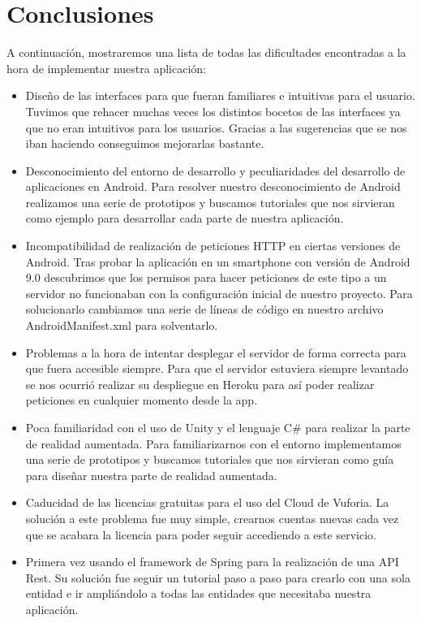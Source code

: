 \section{Conclusiones}
\label{makereference4.8}
A continuación, mostraremos una lista de todas las dificultades encontradas a la hora de implementar nuestra aplicación:
\begin{itemize}
    \item Diseño de las interfaces para que fueran familiares e intuitivas para el usuario. Tuvimos que rehacer muchas veces los distintos bocetos de las interfaces ya que no eran intuitivos para los usuarios. Gracias a las sugerencias que se nos iban haciendo conseguimos mejorarlas bastante.
    \item Desconocimiento del entorno de desarrollo y peculiaridades del desarrollo de aplicaciones en Android. Para resolver nuestro desconocimiento de Android realizamos una serie de prototipos y buscamos tutoriales que nos sirvieran como ejemplo para desarrollar cada parte de nuestra aplicación.
    \item Incompatibilidad de realización de peticiones HTTP en ciertas versiones de Android. Tras probar la aplicación en un smartphone con versión de Android 9.0 descubrimos que los permisos para hacer peticiones de este tipo a un servidor no funcionaban con la configuración inicial de nuestro proyecto. Para solucionarlo cambiamos una serie de líneas de código en nuestro archivo AndroidManifest.xml para solventarlo.
    \item Problemas a la hora de intentar desplegar el servidor de forma correcta para que fuera accesible siempre. Para que el servidor estuviera siempre levantado se nos ocurrió realizar su despliegue en Heroku para así poder realizar peticiones en cualquier momento desde la app.
    \item Poca familiaridad con el uso de Unity y el lenguaje C\# para realizar la parte de realidad aumentada. Para familiarizarnos con el entorno implementamos una serie de prototipos y buscamos tutoriales que nos sirvieran como guía para diseñar nuestra parte de realidad aumentada. 
    \item Caducidad de las licencias gratuitas para el uso del Cloud de Vuforia. La solución a este problema fue muy simple, crearnos cuentas nuevas cada vez que se acabara la licencia para poder seguir accediendo a este servicio.
    \item Primera vez usando el framework de Spring para la realización de una API Rest. Su solución fue seguir un tutorial paso a paso para crearlo con una sola entidad e ir ampliándolo a todas las entidades que necesitaba nuestra aplicación.

\end{itemize}
